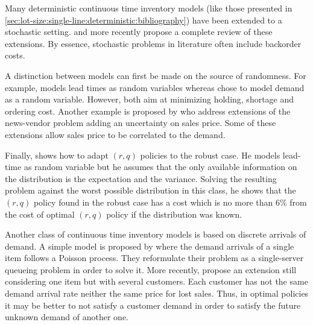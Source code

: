 Many deterministic continuous time inventory models (like those presented in \cref{sec:lot-size:single-line:deterministic:bibliography}) have been extended to a stochastic setting.
\citet{Candace1995} and more recently \citet{Ziukov2015} propose a complete review of these extensions.
By essence, stochastic problems in literature often include backorder costs.


\medskip


A distinction between models can first be made on the source of randomness.
For example, \citet{Friedman1984} models lead times as random variables whereas \citet{Eynan2007} chose to model demand as a random variable.
However, both aim at minimizing holding, shortage and ordering cost.
Another example is proposed by \citet{Sana2011} who address extensions of the news-vendor problem adding an uncertainty on sales price.
Some of these extensions allow sales price to be correlated to the demand.


Finally, \citet{Gallego1998} shows how to adapt $(r,q)$ policies to the robust case.
He models lead-time as random variable but he assumes that the only available information on the distribution is the expectation and the variance.
Solving the resulting problem against the worst possible distribution in this class, he shows that the $(r,q)$ policy found in the robust case has a cost which is no more than 6\% from the cost of optimal $(r,q)$ policy if the distribution was known.


\medskip


Another class of continuous time inventory models is based on discrete arrivals of demand.
A simple model is proposed by \citet{Gavish1980} where the demand arrivals of a single item follows a Poisson process.
They reformulate their problem as a single-server queueing problem in order to solve it.
More recently, \citet{Gayon2009} propose an extension still considering one item but with several customers.
Each customer has not the same demand arrival rate neither the same price for lost sales.
Thus, in optimal policies it may be better to not satisfy a customer demand in order to satisfy the future unknown demand of another one.


\medskip


